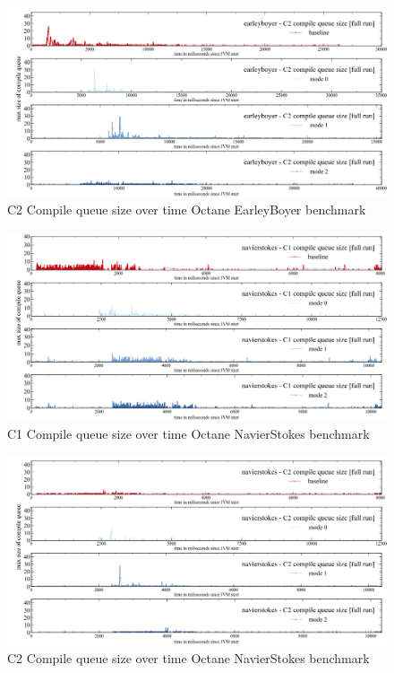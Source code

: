 \begin{figure}[ht]
  \begin{center}
    \centering
    \includegraphics[width=1.0\textwidth]{figures/octane_queue_earleyboyer_separate_c2.png}
    \caption{C2 Compile queue size over time Octane EarleyBoyer benchmark}
    \label{f:octane_queue_earleyboyer_separate_c2}
  \end{center}
\end{figure}
\begin{figure}[ht]
  \begin{center}
    \centering
    \includegraphics[width=1.0\textwidth]{figures/octane_queue_navierstokes_separate_c1.png}
    \caption{C1 Compile queue size over time Octane NavierStokes benchmark}
    \label{f:octane_queue_navierstokes_separate_c1}
  \end{center}
\end{figure}
\begin{figure}[ht]
  \begin{center}
    \centering
    \includegraphics[width=1.0\textwidth]{figures/octane_queue_navierstokes_separate_c2.png}
    \caption{C2 Compile queue size over time Octane NavierStokes benchmark}
    \label{f:octane_queue_navierstokes_separate_c2}
  \end{center}
\end{figure}
